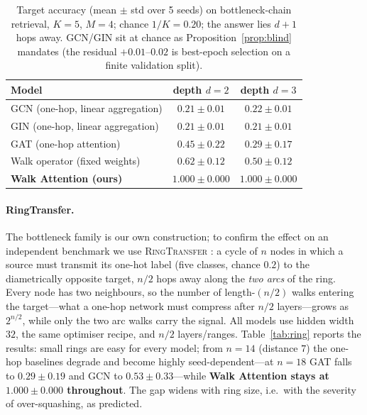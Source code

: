 \documentclass[runningheads]{llncs}
\begin{document}
\begin{table}[t]
\centering
\caption{Target accuracy (mean $\pm$ std over 5 seeds) on bottleneck-chain
retrieval, $K{=}5$, $M{=}4$; chance $1/K=0.20$; the answer lies $d{+}1$ hops
away. GCN/GIN sit at chance as Proposition~\ref{prop:blind} mandates (the
residual $+0.01$--$0.02$ is best-epoch selection on a finite validation
split).}
\label{tab:main}
\begin{tabular}{lcc}
\toprule
\textbf{Model} & \textbf{depth $d=2$} & \textbf{depth $d=3$} \\
\midrule
GCN (one-hop, linear aggregation)  & $0.21\pm0.01$ & $0.22\pm0.01$ \\
GIN (one-hop, linear aggregation)  & $0.21\pm0.01$ & $0.21\pm0.01$ \\
GAT (one-hop attention)            & $0.45\pm0.22$ & $0.29\pm0.17$ \\
Walk operator (fixed weights)      & $0.62\pm0.12$ & $0.50\pm0.12$ \\
\textbf{Walk Attention (ours)}     & $\mathbf{1.000\pm0.000}$ & $\mathbf{1.000\pm0.000}$ \\
\bottomrule
\end{tabular}
\end{table}

\paragraph{RingTransfer.}
The bottleneck family is our own construction; to confirm the effect on an
independent benchmark we use \textsc{RingTransfer}
\cite{digiovanni2023oversquashing}: a cycle of $n$ nodes in which a source must
transmit its one-hot label (five classes, chance $0.2$) to the diametrically
opposite target, $n/2$ hops away along the \emph{two arcs} of the ring. Every
node has two neighbours, so the number of length-$(n/2)$ walks entering the
target---what a one-hop network must compress after $n/2$ layers---grows as
$2^{n/2}$, while only the two arc walks carry the signal. All models use hidden
width $32$, the same optimiser recipe, and $n/2$ layers/ranges.
Table~\ref{tab:ring} reports the results: small rings are easy for every model;
from $n{=}14$ (distance $7$) the one-hop baselines degrade and become highly
seed-dependent---at $n{=}18$ GAT falls to $0.29\pm0.19$ and GCN to
$0.53\pm0.33$---while \textbf{Walk Attention stays at $1.000\pm0.000$
throughout}. The gap widens with ring size, i.e.\ with the severity of
over-squashing, as predicted.
\end{document}
